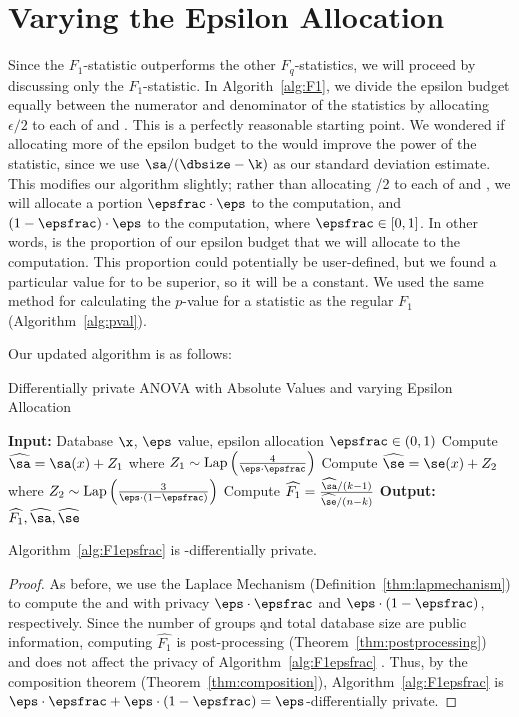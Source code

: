 
\section{Varying the Epsilon Allocation}
Since the $F_1$-statistic outperforms the other $F_q$-statistics, we will proceed by discussing only the $F_1$-statistic. In Algorith~\ref{alg:F1}, we divide the epsilon budget equally between the numerator and denominator of the statistics by allocating $\epsilon/2$ to each of \sa and \se. This is a perfectly reasonable starting point. We wondered if allocating more of the epsilon budget to the \sa would improve the power of the statistic, since we use $\sa/(\dbsize - \k)$ as our standard deviation estimate. This modifies our algorithm slightly; rather than allocating \eps/2 to each of \sa and \se, we will allocate a portion $\epsfrac \cdot \eps$ to the \sa  computation, and $(1-\epsfrac)\cdot \eps$ to the \se computation, where $\epsfrac \in [0,1]$.  In other words, \epsfrac is the proportion of our epsilon budget that we will allocate to the \sa computation. This proportion could potentially be user-defined, but we found a particular value for \epsfrac to be superior, so it will be a constant. We used the same method for calculating the $p$-value for a statistic as the regular $F_1$ (Algorithm~\ref{alg:pval}).

Our updated algorithm is as follows: 
\begin{algorithm}
    \caption{Differentially private ANOVA with Absolute Values and varying Epsilon Allocation \label{alg:F1epsfrac}}
    \begin{algorithmic}
        \STATE \textbf{Input:} Database $\x$, $\eps$ value, epsilon allocation $\epsfrac \in (0,1)$
        \STATE Compute $\widehat{\sa} = \sa(x) + Z_1$ where $Z_1\sim\text{Lap}\left(\frac{4}{\eps\cdot\epsfrac}\right)$
        \STATE Compute $\widehat{\se} = \se(x) + Z_2$ where $Z_2\sim\text{Lap}\left(\frac{3}{\eps\cdot(1-\epsfrac)}\right)$
        \STATE Compute $\widehat{F_1} = \frac{\widehat{\sa}/(k-1)}{\widehat{\se}/(n-k)}$
        \STATE \textbf{Output:} $\widehat{F_1}, \widehat{\sa}, \widehat{\se}$
    \end{algorithmic}
\end{algorithm}

\begin{theorem}
Algorithm~\ref{alg:F1epsfrac} is \eps -differentially private.
\end{theorem}
\begin{proof}
As before, we use the Laplace Mechanism (Definition~\ref{thm:lapmechanism}) to compute the \sa and \se with privacy $\eps\cdot\epsfrac$ and $\eps\cdot(1-\epsfrac)$, respectively. Since the number of groups \k and total database size \dbsize are public information, computing $\widehat{F_1}$ is post-processing (Theorem~\ref{thm:postprocessing}) and does not affect the privacy of Algorithm~\ref{alg:F1epsfrac} . Thus, by the composition theorem (Theorem~\ref{thm:composition}), Algorithm~\ref{alg:F1epsfrac} is $\eps\cdot\epsfrac + \eps\cdot(1-\epsfrac) = \eps$-differentially private.
\end{proof}

